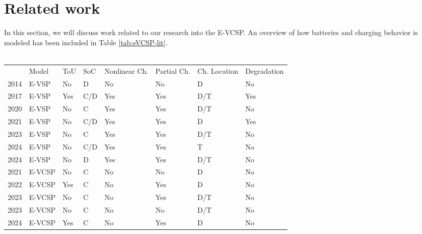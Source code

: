\documentclass[]{article}
\begin{document}
\section{Related work}
In this section, we will discuss work related to our research into the E-VCSP.
An overview of how batteries and charging behavior is modeled has been included
in Table \ref{tab:eVCSP-lit}. \\\\
\begin{table}[]
  \centering
  \begin{tabular}{clllllll}
    \toprule
                                     & Model   & ToU & SoC & Nonlinear Ch. & Partial Ch. & Ch. Location & Degradation \\
    \cmidrule(lr){2-8}
    \cite{Li2014} 2014               & E-VSP   & No  & D   & No            & No          & D            & No          \\
    \cite{vanKootenNiekerk2017} 2017 & E-VSP   & Yes & C/D & Yes           & Yes         & D/T          & Yes         \\
    \cite{Olsen2020} 2020            & E-VSP   & No  & C   & Yes           & Yes         & D/T          & No          \\
    \cite{Zhang2021} 2021            & E-VSP   & No  & C/D & Yes           & Yes         & D            & Yes         \\
    \cite{Parmentier2023} 2023       & E-VSP   & No  & C   & Yes           & Yes         & D/T          & No          \\
    \cite{Pulyassary2024} 2024       & E-VSP   & No  & C/D & Yes           & Yes         & T            & No          \\
    \cite{deVos2024} 2024            & E-VSP   & No  & D   & Yes           & Yes         & D/T          & No          \\
    \addlinespace[0.4em]
    \cite{Perumal2021} 2021          & E-VCSP  & No  & C   & No            & No          & D            & No          \\
    \cite{Wang2022} 2022             & E-VCSP  & Yes & C   & No            & Yes         & D            & No          \\
    \cite{Sistig2023} 2023           & E-VCSP  & No  & C   & No            & Yes         & D/T          & No          \\
    \cite{Shen2023} 2023             & E-VCSP  & No  & C   & No            & No          & D/T          & No          \\
    \cite{Cong2024} 2024             & E-VCSP  & Yes & C   & No            & Yes         & D            & No          \\

\end{tabular}
\end{table}
\end{document}
